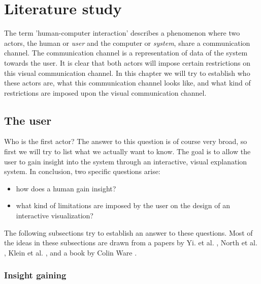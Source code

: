 \chapter{Literature study}\label{chapter:literature_study}

The term 'human-computer interaction' describes a phenomenon where two actors, the human or \emph{user} and the computer or \emph{system}, share a communication channel. The communication channel is a representation of data of the system towards the user. It is clear that both actors will impose certain restrictions on this visual communication channel\cite{shirley:2009, ware:2004}. In this chapter we will try to establish who these actors are, what this communication channel looks like, and what kind of restrictions are imposed upon the visual communication channel. 



% 
\section{The user}\label{chapter:literature_study:section:user}

Who is the first actor? The answer to this question is of course very broad, so first we will try to list what we actually want to know. The goal is to allow the user to gain insight into the system through an interactive, visual explanation system. In conclusion, two specific questions arise:

\begin{itemize}
	\item how does a human gain insight?
	\item what kind of limitations are imposed by the user on the design of an interactive visualization?
\end{itemize}

The following subsections try to establish an answer to these questions. Most of the ideas in these subsections are drawn from a papers by Yi. et al. \cite{yi:2008}, North et al. \cite{north:2006}, Klein et al. \cite{Klein:2006:MSS:1158821.1159015, klein:2006:MSS:1175882.1176017}, and a book by Colin Ware \cite{ware:2004}.


\subsection{Insight gaining}\label{chapter:literature_study:section:user:subsection:insight}

